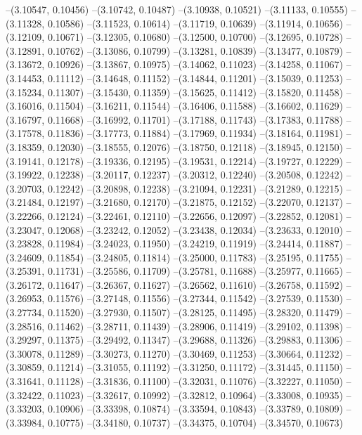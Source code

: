 --(3.10547, 0.10456)
--(3.10742, 0.10487)
--(3.10938, 0.10521)
--(3.11133, 0.10555)
--(3.11328, 0.10586)
--(3.11523, 0.10614)
--(3.11719, 0.10639)
--(3.11914, 0.10656)
--(3.12109, 0.10671)
--(3.12305, 0.10680)
--(3.12500, 0.10700)
--(3.12695, 0.10728)
--(3.12891, 0.10762)
--(3.13086, 0.10799)
--(3.13281, 0.10839)
--(3.13477, 0.10879)
--(3.13672, 0.10926)
--(3.13867, 0.10975)
--(3.14062, 0.11023)
--(3.14258, 0.11067)
--(3.14453, 0.11112)
--(3.14648, 0.11152)
--(3.14844, 0.11201)
--(3.15039, 0.11253)
--(3.15234, 0.11307)
--(3.15430, 0.11359)
--(3.15625, 0.11412)
--(3.15820, 0.11458)
--(3.16016, 0.11504)
--(3.16211, 0.11544)
--(3.16406, 0.11588)
--(3.16602, 0.11629)
--(3.16797, 0.11668)
--(3.16992, 0.11701)
--(3.17188, 0.11743)
--(3.17383, 0.11788)
--(3.17578, 0.11836)
--(3.17773, 0.11884)
--(3.17969, 0.11934)
--(3.18164, 0.11981)
--(3.18359, 0.12030)
--(3.18555, 0.12076)
--(3.18750, 0.12118)
--(3.18945, 0.12150)
--(3.19141, 0.12178)
--(3.19336, 0.12195)
--(3.19531, 0.12214)
--(3.19727, 0.12229)
--(3.19922, 0.12238)
--(3.20117, 0.12237)
--(3.20312, 0.12240)
--(3.20508, 0.12242)
--(3.20703, 0.12242)
--(3.20898, 0.12238)
--(3.21094, 0.12231)
--(3.21289, 0.12215)
--(3.21484, 0.12197)
--(3.21680, 0.12170)
--(3.21875, 0.12152)
--(3.22070, 0.12137)
--(3.22266, 0.12124)
--(3.22461, 0.12110)
--(3.22656, 0.12097)
--(3.22852, 0.12081)
--(3.23047, 0.12068)
--(3.23242, 0.12052)
--(3.23438, 0.12034)
--(3.23633, 0.12010)
--(3.23828, 0.11984)
--(3.24023, 0.11950)
--(3.24219, 0.11919)
--(3.24414, 0.11887)
--(3.24609, 0.11854)
--(3.24805, 0.11814)
--(3.25000, 0.11783)
--(3.25195, 0.11755)
--(3.25391, 0.11731)
--(3.25586, 0.11709)
--(3.25781, 0.11688)
--(3.25977, 0.11665)
--(3.26172, 0.11647)
--(3.26367, 0.11627)
--(3.26562, 0.11610)
--(3.26758, 0.11592)
--(3.26953, 0.11576)
--(3.27148, 0.11556)
--(3.27344, 0.11542)
--(3.27539, 0.11530)
--(3.27734, 0.11520)
--(3.27930, 0.11507)
--(3.28125, 0.11495)
--(3.28320, 0.11479)
--(3.28516, 0.11462)
--(3.28711, 0.11439)
--(3.28906, 0.11419)
--(3.29102, 0.11398)
--(3.29297, 0.11375)
--(3.29492, 0.11347)
--(3.29688, 0.11326)
--(3.29883, 0.11306)
--(3.30078, 0.11289)
--(3.30273, 0.11270)
--(3.30469, 0.11253)
--(3.30664, 0.11232)
--(3.30859, 0.11214)
--(3.31055, 0.11192)
--(3.31250, 0.11172)
--(3.31445, 0.11150)
--(3.31641, 0.11128)
--(3.31836, 0.11100)
--(3.32031, 0.11076)
--(3.32227, 0.11050)
--(3.32422, 0.11023)
--(3.32617, 0.10992)
--(3.32812, 0.10964)
--(3.33008, 0.10935)
--(3.33203, 0.10906)
--(3.33398, 0.10874)
--(3.33594, 0.10843)
--(3.33789, 0.10809)
--(3.33984, 0.10775)
--(3.34180, 0.10737)
--(3.34375, 0.10704)
--(3.34570, 0.10673)
